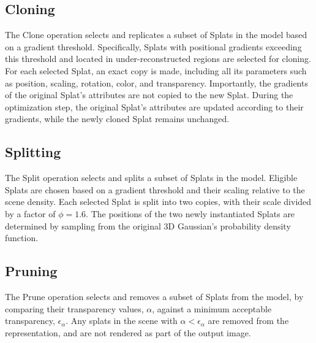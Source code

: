 \documentclass[11pt]{report}
\begin{document}
\subsection{Cloning}
The Clone operation selects and replicates a subset of Splats in the model based on a gradient threshold. Specifically, Splats with positional gradients exceeding this threshold and located in under-reconstructed regions are selected for cloning. For each selected Splat, an exact copy is made, including all its parameters such as position, scaling, rotation, color, and transparency. Importantly, the gradients of the original Splat's attributes are not copied to the new Splat. During the optimization step, the original Splat's attributes are updated according to their gradients, while the newly cloned Splat remains unchanged.

\subsection{Splitting}
The Split operation selects and splits a subset of Splats in the model. Eligible Splats are chosen based on a gradient threshold and their scaling relative to the scene density. Each selected Splat is split into two copies, with their scale divided by a factor of $\phi = 1.6$. The positions of the two newly instantiated Splats are determined by sampling from the original 3D Gaussian's probability density function.

\subsection{Pruning}
The Prune operation selects and removes a subset of Splats from the model, by comparing their transparency values, $\alpha$, against a minimum acceptable transparency, $\epsilon_{\alpha}$. Any splats in the scene with $\alpha < \epsilon_{\alpha}$ are removed from the representation, and are not rendered as part of the output image.
\end{document}
